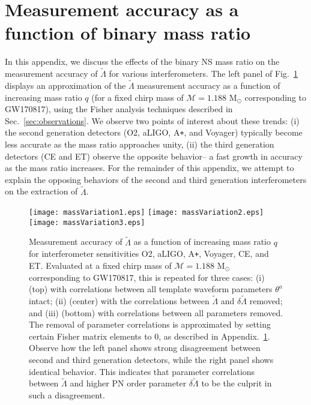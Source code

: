 \documentclass[prd,twocolumn,nofootinbib,superscriptaddress,amsmath,amssymb]{revtex4-1}
\begin{document}
\section{Measurement accuracy as a function of binary mass ratio}\label{app:measurement}
In this appendix, we discuss the effects of the binary NS mass ratio on the measurement accuracy of $\tilde\Lambda$ for various interferometers. 
The left panel of Fig.~\ref{fig:massVariation} displays an approximation of the $\tilde\Lambda$ measurement accuracy as a function of increasing mass ratio $q$ (for a fixed chirp mass of $\mathcal{M}=1.188 \text{ M}_{\odot}$ corresponding to GW170817), using the Fisher analysis techniques described in Sec.~\ref{sec:observations}.
We observe two points of interest about these trends: (i) the second generation detectors (O2, aLIGO, A\texttt{+}, and Voyager) typically become less accurate as the mass ratio approaches unity, (ii) the third generation detectors (CE and ET) observe the opposite behavior-- a fast growth in accuracy as the mass ratio increases.
For the remainder of this appendix, we attempt to explain the opposing behaviors of the second and third generation interferometers on the extraction of $\tilde\Lambda$.

\begin{figure}
\begin{center} 
\texttt{[image: massVariation1.eps]}
\texttt{[image: massVariation2.eps]}
\texttt{[image: massVariation3.eps]}
\end{center}
\caption{
Measurement accuracy of $\tilde\Lambda$ as a function of increasing mass ratio $q$ for interferometer sensitivities O2, aLIGO, A\texttt{+}, Voyager, CE, and ET.
Evaluated at a fixed chirp mass of $\mathcal{M}=1.188\text{ M}_{\odot}$ corresponding to GW170817, this is repeated for three cases: (i) (top) with correlations between all template waveform parameters $\theta^a$ intact; (ii) (center) with the correlations between $\tilde\Lambda$ and $\delta\tilde\Lambda$ removed; and (iii) (bottom) with correlations between all parameters removed.
The removal of parameter correlations is approximated by setting certain Fisher matrix elements to 0, as described in Appendix.~\ref{app:measurement}.
Observe how the left panel shows strong disagreement between second and third generation detectors, while the right panel shows identical behavior.
This indicates that parameter correlations between $\tilde\Lambda$ and higher PN order parameter $\delta\tilde\Lambda$ to be the culprit in such a disagreement.
}
\label{fig:massVariation}
\end{figure} 
\end{document}
